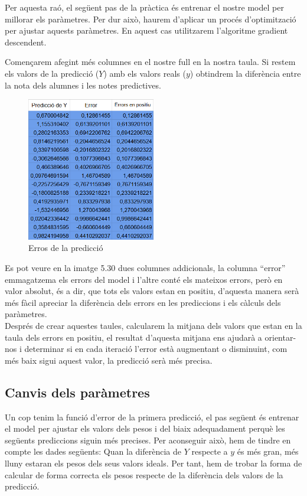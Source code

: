 Per aquesta raó, el següent pas de la pràctica és entrenar el nostre model per millorar els paràmetres. Per dur això, haurem d'aplicar un procés d'optimització per ajustar aquests paràmetres. En aquest cas utilitzarem l'algoritme gradient descendent.

Començarem afegint més columnes en el nostre full en la nostra taula. Si restem els valors de la predicció ($Y$) amb els valors reals ($y$) obtindrem la diferència entre la nota dels alumnes i les notes predictives.

\begin{figure}[H]
    \centering
    \includegraphics[width=0.5\textwidth]{./figures/Errors.png}
    \caption{Erros de la predicció}
\end{figure}

Es pot veure en la imatge 5.30 dues columnes addicionals, la columna ``error'' emmagatzema els errors del model i l'altre conté els mateixos errors, però en valor absolut, és a dir, que tots els valors estan en positiu, d'aquesta manera serà més fàcil apreciar la diferència dels errors en les prediccions i els càlculs dels paràmetres.\\

Després de crear aquestes taules, calcularem la mitjana dels valors que estan en la taula dels errors en positiu, el resultat d'aquesta mitjana ens ajudarà a orientar-nos i determinar si en cada iteració l'error està augmentant o disminuint, com més baix sigui aquest valor, la predicció serà més precisa.\\
\subsection{Canvis dels paràmetres}
Un cop tenim la funció d'error de la primera predicció, el pas següent és entrenar el model per ajustar els valors dels pesos i del biaix adequadament perquè les següents prediccions siguin més precises.
Per aconseguir això, hem de tindre en compte les dades següents: Quan la diferència de $Y$ respecte a $y$ és més gran, més lluny estaran els pesos dels seus valors ideals. Per tant, hem de trobar la forma de calcular de forma correcta els pesos respecte de la diferència dels valors de la predicció.


